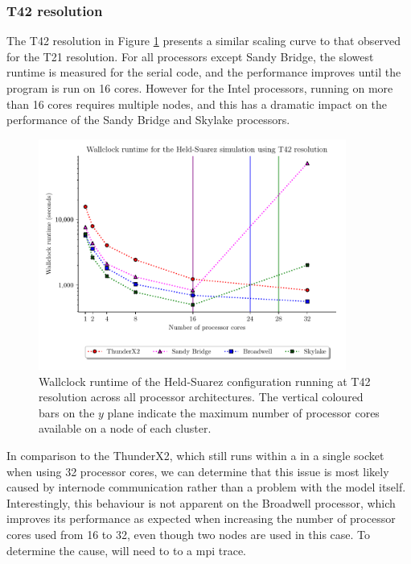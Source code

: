 \documentclass[a4paper,11pt]{report}
\begin{document}
\subsubsection{T42 resolution}
The T42 resolution in Figure \ref{fig:t42-scale} presents a similar scaling curve to that observed for the T21 resolution. For all processors except Sandy Bridge, the slowest runtime is measured for the serial code, and the performance improves until the program is run on 16 cores. However for the Intel processors, running on more than 16 cores requires multiple nodes, and this has a dramatic impact on the performance of the Sandy Bridge and Skylake processors. 
\par
\begin{figure}[htbp]
\begin{center}
\includegraphics[width=0.9\textwidth]{img/scaling_graph_T42_Held_suarez.pdf}
\caption{Wallclock runtime of the Held-Suarez configuration running at T42 resolution across all processor architectures. The vertical coloured bars on the $y$ plane indicate the maximum number of processor cores available on a node of each cluster.}
\label{fig:t42-scale}
\end{center}
\end{figure}
\par
In comparison to the ThunderX2, which still runs within a in a single socket when using 32 processor cores, we can determine that this issue is most likely caused by internode communication rather than a problem with the model itself. Interestingly, this behaviour is not apparent on the Broadwell processor, which improves its performance as expected when increasing the number of processor cores used from 16 to 32, even though two nodes are used in this case. To determine the cause, will need to to a mpi trace.
\par
\end{document}
